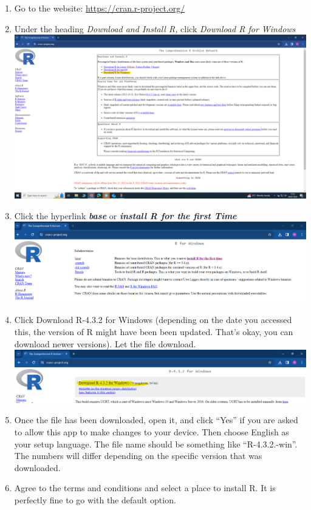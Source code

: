 \documentclass[
]{book}
\providecommand{\tightlist}{%
  \setlength{\itemsep}{0pt}\setlength{\parskip}{0pt}}
\begin{document}
\begin{enumerate}
\def\labelenumi{\arabic{enumi}.}
\tightlist
\item
  Go to the website: \url{https://cran.r-project.org/}
\item
  Under the heading \emph{Download and Install R,} click \emph{Download R for Windows} \includegraphics[width=29.20833in,height=\textheight]{img/01-cran.png}
\item
  Click the hyperlink \textbf{\emph{base}} or \textbf{\emph{install R for the first Time}}\includegraphics{img/01-base.png}
\item
  Click Download R-4.3.2 for Windows (depending on the date you accessed this, the version of R might have been been updated. That's okay, you can download newer versions). Let the file download. \includegraphics{img/01-download.png}
\item
  Once the file has been downloaded, open it, and click ``Yes'' if you are asked to allow this app to make changes to your device. Then choose English as your setup language. The file name should be something like ``R-4.3.2.-win''. The numbers will differ depending on the specific version that was downloaded.
\item
  Agree to the terms and conditions and select a place to install R. It is perfectly fine to go with the default option.
\end{enumerate}
\end{document}
